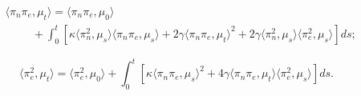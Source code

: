 \documentclass[11pt, notitlepage]{article}
\begin{document}
\begin{equation}\begin{split}\label{eq: ODE2}
    &\langle \pi_n \pi_e, \mu_t\rangle =
    \langle \pi_n\pi_e, \mu_0\rangle \\&\hspace{1cm}+ \int_0^t \left[\kappa\langle \pi_n^2, \mu_s\rangle\langle \pi_n\pi_e, \mu_s\rangle+2\gamma\langle \pi_n\pi_e, \mu_t\rangle^2+2\gamma\langle\pi_n^2, \mu_s\rangle\langle \pi_e^2, \mu_s \rangle \right] ds;
\end{split}\end{equation}

\begin{equation} \label{eq: ODE3}
    \langle \pi_e^2, \mu_t\rangle =
    \langle \pi_e^2, \mu_0\rangle + \int_0^t \left[\kappa\langle \pi_n\pi_e, \mu_s\rangle^2+4\gamma\langle \pi_n\pi_e, \mu_t\rangle\langle\pi_e^2, \mu_s \rangle \right] ds.

\end{equation}
\end{document}
